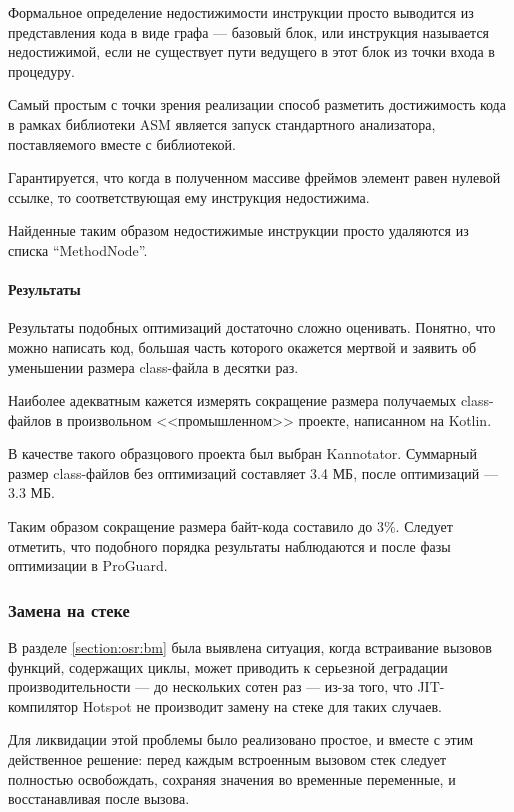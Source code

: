 Формальное определение недостижимости инструкции просто выводится из представления кода в виде
графа --- базовый блок, или инструкция называется недостижимой, если не существует пути
ведущего в этот блок из точки входа в процедуру.

Самый простым с точки зрения реализации способ разметить достижимость кода в рамках библиотеки ASM
является запуск стандартного анализатора, поставляемого вместе с библиотекой.

Гарантируется, что когда в полученном массиве фреймов элемент равен нулевой ссылке, то
соответствующая ему инструкция недостижима.

Найденные таким образом недостижимые инструкции просто удаляются из списка ``MethodNode''.

\paragraph{Результаты}
Результаты подобных оптимизаций достаточно сложно оценивать.
Понятно, что можно написать код, большая часть которого окажется мертвой и заявить об уменьшении
размера class-файла в десятки раз.

Наиболее адекватным кажется измерять сокращение размера получаемых class-файлов в произвольном
<<промышленном>> проекте, написанном на Kotlin.

В качестве такого образцового проекта был выбран Kannotator.
Суммарный размер class-файлов без оптимизаций составляет 3.4 МБ, после оптимизаций --- 3.3 МБ.

Таким образом сокращение размера байт-кода составило до 3\%.
Следует отметить, что подобного порядка результаты наблюдаются и после фазы оптимизации
в ProGuard.

\subsubsection{Замена на стеке}
\label{section:osr:opt}
В разделе \ref{section:osr:bm} была выявлена ситуация, когда встраивание вызовов функций, содержащих
циклы, может приводить к серьезной деградации производительности --- до нескольких сотен раз ---
из-за того, что JIT-компилятор Hotspot не производит замену на стеке для таких случаев.

Для ликвидации этой проблемы было реализовано простое, и вместе с этим действенное решение:
перед каждым встроенным вызовом стек следует полностью освобождать, сохраняя значения во временные
переменные, и восстанавливая после вызова.

